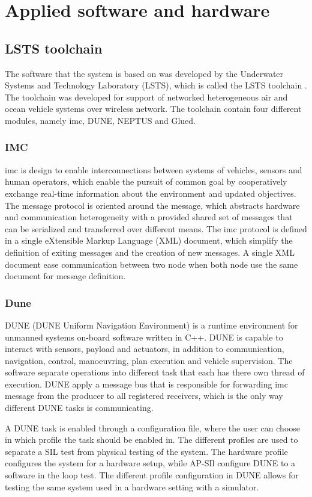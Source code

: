\chapter{Applied software and hardware}
\section{LSTS toolchain}
The software that the system is based on was developed by the Underwater Systems and Technology Laboratory (LSTS), which is called the LSTS toolchain \citep{pinto2013lsts}. The toolchain was developed for support of networked heterogeneous air and ocean vehicle systems over wireless network. The toolchain contain four different modules, namely \gls{imc}, DUNE, NEPTUS and Glued.
\subsection{IMC}
\gls{imc} \citep{martins2009imc} is design to enable interconnections between systems of vehicles, sensors and human operators, which enable the pursuit of common goal by cooperatively exchange real-time information about the environment and updated objectives. The message protocol is oriented around the message, which abstracts hardware and communication heterogeneity with a provided shared set of messages that can be serialized and transferred over different means. The \gls{imc} protocol is defined in a single eXtensible Markup Language (XML) document, which simplify the definition of exiting messages and the creation of new messages. A single XML document ease communication between two node when both node use the same document for message definition. 
\subsection{Dune}
DUNE (DUNE Uniform Navigation Environment) is a runtime environment for unmanned systems on-board software written in C++. DUNE is capable to interact with sensors, payload and actuators, in addition to communication, navigation, control, manoeuvring, plan execution and vehicle supervision. The software separate operations into different task that each has there own thread of execution. DUNE apply a message bus that is responsible for forwarding \gls{imc} message from the producer to all registered receivers, which is the only way different DUNE tasks is communicating. 

A DUNE task is enabled through a configuration file, where the user can choose in which profile the task should be enabled in. The different profiles are  used to separate a SIL test from physical testing of the system. The hardware profile configures the system for a hardware setup, while AP-SIl configure DUNE to a software in the loop test. The different profile configuration in DUNE allows for testing the same system used in a hardware setting with a simulator.
